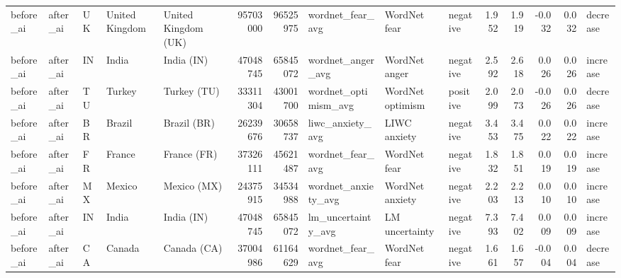 \begin{tabular}{lllllrrlllrrrrl}
before\_ai & after\_ai & UK & United Kingdom & United Kingdom (UK) & 95703000 & 96525975 & wordnet\_fear\_avg & WordNet fear & negative & 1.952 & 1.919 & -0.032 & 0.032 & decrease \\
before\_ai & after\_ai & IN & India & India (IN) & 47048745 & 65845072 & wordnet\_anger\_avg & WordNet anger & negative & 2.592 & 2.618 & 0.026 & 0.026 & increase \\
before\_ai & after\_ai & TU & Turkey & Turkey (TU) & 33311304 & 43001700 & wordnet\_optimism\_avg & WordNet optimism & positive & 2.099 & 2.073 & -0.026 & 0.026 & decrease \\
before\_ai & after\_ai & BR & Brazil & Brazil (BR) & 26239676 & 30658737 & liwc\_anxiety\_avg & LIWC anxiety & negative & 3.453 & 3.475 & 0.022 & 0.022 & increase \\
before\_ai & after\_ai & FR & France & France (FR) & 37326111 & 45621487 & wordnet\_fear\_avg & WordNet fear & negative & 1.832 & 1.851 & 0.019 & 0.019 & increase \\
before\_ai & after\_ai & MX & Mexico & Mexico (MX) & 24375915 & 34534988 & wordnet\_anxiety\_avg & WordNet anxiety & negative & 2.203 & 2.213 & 0.010 & 0.010 & increase \\
before\_ai & after\_ai & IN & India & India (IN) & 47048745 & 65845072 & lm\_uncertainty\_avg & LM uncertainty & negative & 7.393 & 7.402 & 0.009 & 0.009 & increase \\
before\_ai & after\_ai & CA & Canada & Canada (CA) & 37004986 & 61164629 & wordnet\_fear\_avg & WordNet fear & negative & 1.661 & 1.657 & -0.004 & 0.004 & decrease \\
\bottomrule
\end{tabular}
